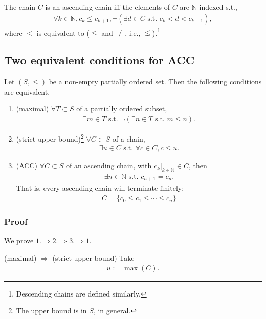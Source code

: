 \documentclass[11pt]{book}
\begin{document}
The chain $C$ is an ascending chain iff the elements of $C$ are $\mathbb{N}$ indexed s.t.,
\begin{eqnarray}
\forall k \in \mathbb{N}, c_k \leq c_{k+1}, \lnot (\exists d \in C \text{ s.t. } c_k < d < c_{k+1}),
\end{eqnarray}
where $<$ is equivalent to ($\leq$ and $\neq$, i.e., $\lneq$).\footnote{Descending chains are defined similarly.}

\subsection{Two equivalent conditions for ACC}
\label{MoreACC}
Let $(S, \leq)$ be a non-empty partially ordered set.
Then the following conditions are equivalent.
\begin{enumerate}
\item (maximal) $\forall T \subset S$ of a partially ordered subset,
\begin{eqnarray}
\exists m \in T \text{ s.t. } \lnot( \exists n \in T \text{ s.t. } m \leq n).
\end{eqnarray}

\item (strict upper bound)\footnote{The upper bound is in $S$, in general.} $\forall C \subset S$ of a chain,
\begin{eqnarray}
\exists u \in C \text{ s.t. } \forall c \in C, c \leq u.
\end{eqnarray}
 
\item (ACC) $\forall C \subset S$ of an ascending chain, with $\left. c_k \right|_{k \in \mathbb{N}} \in C$, then
\begin{eqnarray}
\exists n \in \mathbb{N} \text{ s.t. } c_{n+1} = c_{n}.
\end{eqnarray}
That is, every ascending chain will terminate finitely:
\begin{eqnarray}
C = \{c_0 \leq c_1 \leq \cdots \leq c_n\}
\end{eqnarray}

\end{enumerate}

\subsubsection{Proof}
We prove $1. \Rightarrow 2. \Rightarrow 3. \Rightarrow 1.$
 
(maximal) $\Rightarrow $ (strict upper bound)
Take
\begin{eqnarray}
u := \max (C).
\end{eqnarray}
\end{document}
